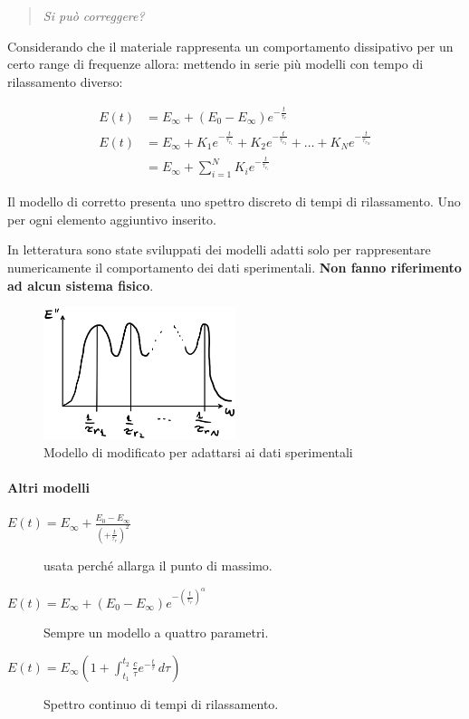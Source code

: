 \begin{quote}
\emph{Si può correggere?}
\end{quote}
Considerando che il materiale rappresenta un comportamento dissipativo per un certo range di frequenze allora: mettendo in serie più modelli con tempo di rilassamento diverso:

\begin{equation}
\begin{split}
E(t) &= E_{\infty} + (E_0-E_{\infty})e^{-\frac{t}{\tau_r}}\\
E(t) &= E_{\infty} + K_1e^{-\frac{t}{\tau_{r_1}}} + K_2e^{-\frac{t}{\tau_{r_2}}} + \dots + K_Ne^{-\frac{t}{\tau_{r_N}}}\\
&= E_{\infty} + \sum_{i=1}^N{K_ie^{-\frac{t}{\tau_{r_i}}}}
\end{split}
\end{equation}

Il modello di  corretto presenta uno spettro discreto di tempi di rilassamento. Uno per ogni elemento aggiuntivo inserito.\\

In letteratura sono state sviluppati dei modelli adatti solo per rappresentare numericamente il comportamento dei dati sperimentali.
\textbf{Non fanno riferimento ad alcun sistema fisico}.

\begin{figure}
\centering
\includegraphics[width = 0.5\textwidth]{gfx/ZenerMod}
\caption{Modello di  modificato per adattarsi ai dati sperimentali}
\label{fig:ZenerMod}
\end{figure}

\paragraph{Altri modelli}
\begin{description}
\item[$E(t) = E_{\infty} + \frac{E_0 - E_{\infty}}{\left(+\frac{t}{\tau_r}\right)^2}$] usata perché allarga il punto di massimo.
\item[$E(t) = E_{\infty} + \left(E_0 - E_{\infty}\right)e^{-\left(\frac{t}{\tau_r}\right)^\alpha}$] Sempre un modello a quattro parametri.
\item[$E(t) = E_{\infty}\left(1+\int_{t_1}^{t_2}{\frac{c}{\tau}e^{-\frac{t}{\tau}}\,d\tau}\right)$] Spettro continuo di tempi di rilassamento.
\end{description}

